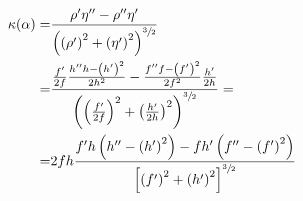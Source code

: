 \documentclass[a4paper,10pt]{article}
\theoremstyle{plain}
\theoremstyle{definition}
\theoremstyle{remark}
\newcommand{\pa}[1]{\left(#1\right)}
\newcommand{\bra}[1]{\left[#1\right]}
\begin{document}
\begin{align*}
  \kappa (\alpha) = & \frac{ \rho ' \eta ''  - \rho '' \eta '}{
    \pa{\pa{\rho ' } ^2 + \pa{ \eta ' } ^2 } ^ {\sfrac{3}{2}}} \\
  = &  \frac{ \frac{f'}{2f} \frac{h''h - \pa{h'} ^2}{2h^2}  - \frac{f''f -
      \pa{f'} ^2}{2f^2} \frac{h'}{2h}}  
  { \pa{\pa{\frac{f'}{2f} } ^2 + \pa{ \frac{h'}{2h} } ^2 } ^
    {\sfrac{3}{2}}} = \\
  = & 2fh \frac{f'h\pa{h'' - \pa{h'}^2} - fh' \pa{f'' -
      \pa{f'}^2}}{\bra{\pa{f'}^2 + \pa{h'} ^2 }^{\sfrac{3}{2}}}
\end{align*}
\end{document}
